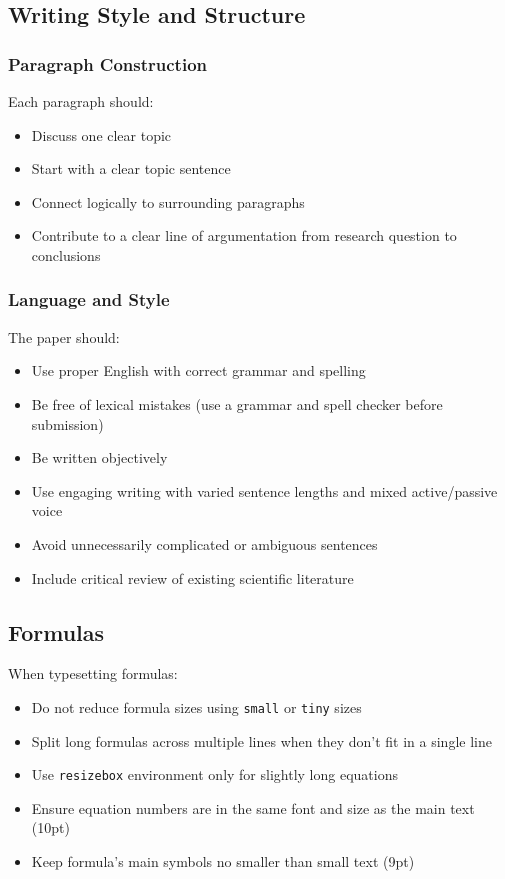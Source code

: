 \subsection{Writing Style and Structure}
\subsubsection{Paragraph Construction}
Each paragraph should:
\begin{itemize}
\item Discuss one clear topic
\item Start with a clear topic sentence
\item Connect logically to surrounding paragraphs
\item Contribute to a clear line of argumentation from research question to conclusions
\end{itemize}

\subsubsection{Language and Style}
The paper should:
\begin{itemize}
\item Use proper English with correct grammar and spelling
\item Be free of lexical mistakes (use a grammar and spell checker before submission)
\item Be written objectively
\item Use engaging writing with varied sentence lengths and mixed active/passive voice
\item Avoid unnecessarily complicated or ambiguous sentences
\item Include critical review of existing scientific literature
\end{itemize}

\subsection{Formulas}
When typesetting formulas:
\begin{itemize}
\item Do not reduce formula sizes using {\tt small} or {\tt tiny} sizes
\item Split long formulas across multiple lines when they don't fit in a single line
\item Use {\tt resizebox} environment only for slightly long equations
\item Ensure equation numbers are in the same font and size as the main text (10pt)
\item Keep formula's main symbols no smaller than {\small small} text (9pt)
\end{itemize}

